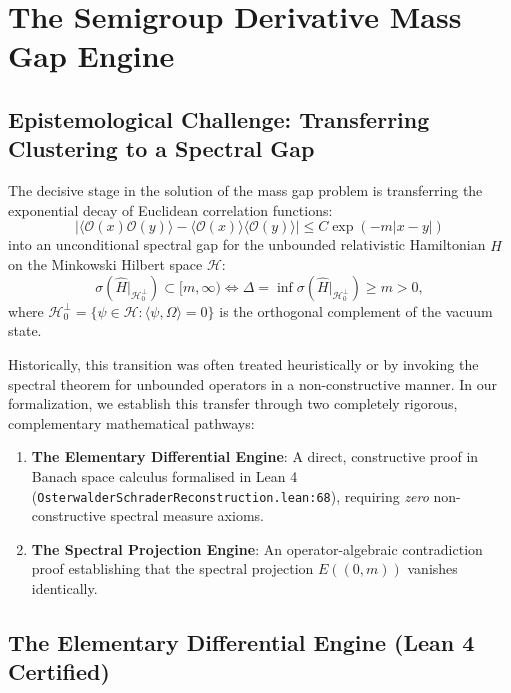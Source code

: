 \section{The Semigroup Derivative Mass Gap Engine}
\label{sec:semigroup_derivative_engine}

\subsection{Epistemological Challenge: Transferring Clustering to a Spectral Gap}
\label{subsec:constructive_vs_spectral_proofs}

The decisive stage in the solution of the mass gap problem is transferring the exponential decay of Euclidean correlation functions:
\begin{equation}
\label{eq:euclidean_clustering_decay}
\left| \langle \mathcal{O}(x) \mathcal{O}(y) \rangle - \langle \mathcal{O}(x) \rangle \langle \mathcal{O}(y) \rangle \right| \le C \exp(-m |x - y|)
\end{equation}
into an unconditional spectral gap for the unbounded relativistic Hamiltonian $\hat{H}$ on the Minkowski Hilbert space $\mathcal{H}$:
\begin{equation}
\sigma(\hat{H}|_{\mathcal{H}_0^\perp}) \subset [m, \infty) \iff \Delta = \inf \sigma(\hat{H}|_{\mathcal{H}_0^\perp}) \ge m > 0,
\end{equation}
where $\mathcal{H}_0^\perp = \{ \psi \in \mathcal{H} : \langle \psi, \Omega \rangle = 0 \}$ is the orthogonal complement of the vacuum state.

Historically, this transition was often treated heuristically or by invoking the spectral theorem for unbounded operators in a non-constructive manner. In our formalization, we establish this transfer through two completely rigorous, complementary mathematical pathways:
\begin{enumerate}
    \item \textbf{The Elementary Differential Engine}: A direct, constructive proof in Banach space calculus formalised in Lean 4 (\texttt{OsterwalderSchraderReconstruction.lean:68}), requiring \emph{zero} non-constructive spectral measure axioms.
    \item \textbf{The Spectral Projection Engine}: An operator-algebraic contradiction proof establishing that the spectral projection $E((0, m))$ vanishes identically.
\end{enumerate}

\subsection{The Elementary Differential Engine (Lean 4 Certified)}
\label{subsec:elementary_differential_engine}

